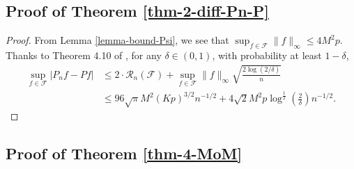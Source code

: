 \documentclass{article}
\begin{document}
\subsection{Proof of Theorem \ref{thm-2-diff-Pn-P}}

\begin{proof}
    From Lemma \ref{lemma-bound-Psi}, we see that $\sup_{f\in \mathcal{F}}\|f\|_{\infty}\le 4M^2p$. Thanks to Theorem 4.10 of \cite{wainwright_2019}, for any $\delta \in (0,1)$, with probability at least $1-\delta$, 
    \begin{align*}
        \sup_{f\in \mathcal{F}}|P_n f-Pf| &\le 2\cdot\mathcal{R}_n(\mathcal{F})+\sup_{f\in \mathcal{F}}\|f\|_{\infty}\sqrt{\frac{2\log(2/\delta)}{n}}\\
        &\le 96\sqrt{\pi}M^2(Kp)^{3/2}n^{-1/2}+4\sqrt{2}M^2p\log^{\tfrac{1}{2}}\left(\frac{2}{\delta}\right) n^{-1/2}.
    \end{align*}
\end{proof}


\subsection{Proof of Theorem \ref{thm-4-MoM}}
\end{document}
